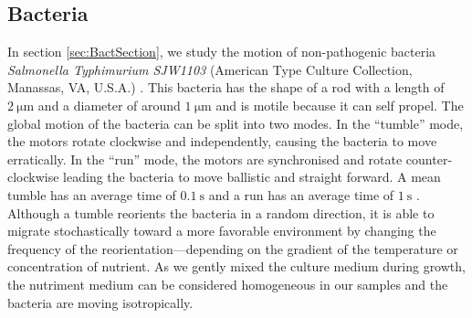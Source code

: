 \documentclass[prb,reprint,amsmath,amssymb]{revtex4-1}
\newcommand{\tg}[1]{{\color{magenta}#1}} %
\begin{document}
\subsection{Bacteria}
In section \ref{sec:BactSection}, we study the motion of non-pathogenic bacteria \tg{\textit{Salmonella Typhimurium SJW1103}  (American Type Culture Collection, Manassas, VA, U.S.A.)} \citep{21_fabrega2013salmonella}. \tg{This bacteria has the shape of a rod with a length of $\SI{2}{\micro\meter}$ and a diameter of around $\SI{1}{\micro\meter}$ and is motile because it can self propel. The global motion of the bacteria can be split into two modes. In the ``tumble'' mode, the motors rotate clockwise and independently, causing the bacteria to move erratically. In the ``run'' mode, the motors are synchronised and rotate counter-clockwise leading the bacteria to move ballistic and straight forward. A mean tumble has an average time of $\SI{0.1}{\second}$ and a run has an average time of $\SI{1}{\second}$ \citep{5_berg2000motile}. Although a tumble reorients the bacteria in a random direction, it is able to migrate stochastically toward a more favorable environment by changing the frequency of the reorientation—depending on the gradient of the temperature or concentration of nutrient. As we gently mixed the culture medium during growth, the nutriment medium can be considered homogeneous in our samples and the bacteria are moving isotropically.}
\end{document}
